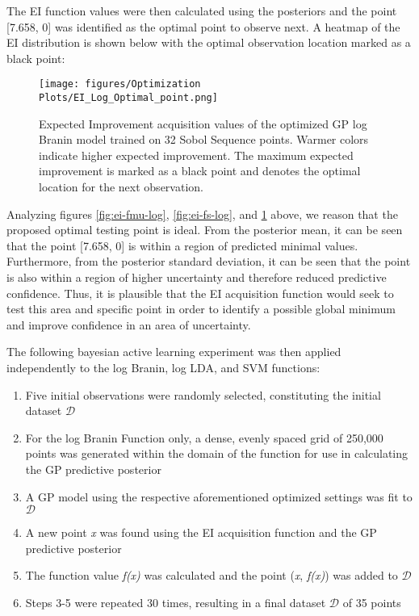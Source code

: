 \documentclass[11pt]{article}
\numberwithin{equation}{section}
\begin{document}
The EI function values were then calculated using the posteriors and the point [7.658, 0] was identified as the optimal point to observe next. 
A heatmap of the EI distribution is shown below with the optimal observation location marked as a black point:

\begin{figure}[H]
  \centering
  \texttt{[image: figures/Optimization Plots/EI\_Log\_Optimal\_point.png]}
  \caption{Expected Improvement acquisition values of the optimized GP log Branin model trained on 32 Sobol Sequence points. Warmer colors indicate higher expected improvement. The maximum expected improvement is marked as a black point and denotes the optimal location for the next observation.}
  \label{fig:ei-optimalPoint-log}
\end{figure}

Analyzing figures \ref{fig:ei-fmu-log}, \ref{fig:ei-fs-log}, and \ref{fig:ei-optimalPoint-log} above, we reason that the proposed optimal testing point is ideal. From the posterior mean, it can be seen that the point [7.658, 0] is within a region of predicted minimal values. Furthermore, from the posterior standard deviation, it can be seen that the point is also within a region of higher uncertainty and therefore reduced predictive confidence. Thus, it is plausible that the EI acquisition function would seek to test this area and specific point in order to identify a possible global minimum and improve confidence in an area of uncertainty. 

The following bayesian active learning experiment was then applied independently to the log Branin, log LDA, and SVM functions:
\begin{enumerate}
  \item Five initial observations were randomly selected, constituting the initial dataset $\mathcal{D}$
  \item For the log Branin Function only, a dense, evenly spaced grid of 250,000 points was generated within the domain of the function for use in calculating the GP predictive posterior
  \item A GP model using the respective aforementioned optimized settings was fit to $\mathcal{D}$
  \item A new point \emph{x} was found using the EI acquisition function and the GP predictive posterior
  \item The function value \emph{f(x)} was calculated and the point (\emph{x}, \emph{f(x)}) was added to $\mathcal{D}$
  \item Steps 3-5 were repeated 30 times, resulting in a final dataset $\mathcal{D}$ of 35 points
\end{enumerate}
\end{document}

